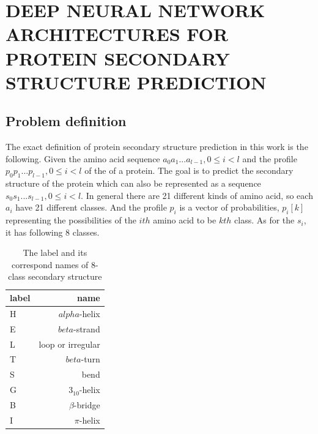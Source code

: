 \chapter{DEEP NEURAL NETWORK ARCHITECTURES FOR PROTEIN SECONDARY STRUCTURE PREDICTION}
	\label{CH_03}

\section{Problem definition}
The exact definition of protein secondary structure prediction in this work is the following. Given the amino acid sequence $a_0a_1...a_{l-1}, 0 \le i <l$ and the profile $p_0p_1...p_{l-1},  0 \le i <l$ of the of a protein. The goal is to predict the secondary structure of the protein which can also be represented as a sequence $s_0s_1...s_{l-1},0 \le i <l$. In general there are 21 different kinds of amino acid, so each $a_i$ have 21 different classes. And the profile $p_i$ is a vector of probabilities, $p_i[k]$ representing the possibilities of the $ith$ amino acid to be $kth$ class. As for the $s_i$, it has following 8 classes.\par
\begin{table}[H] \label{tb:labels}
	\centering
	\begin{tabular}{lr}
	label & name\\
	\hline
	H &$alpha$-helix \\
    E &$beta$-strand \\
    L & loop or irregular \\
    T &$beta$-turn \\
    S &bend \\
    G &$3_10$-helix \\
    B &$\beta$-bridge \\
    I &$\pi$-helix \\
    \hline
	\end{tabular} 
	\caption[secondary structure labels]{The label and its correspond names of 8-class secondary structure}
\end{table}

